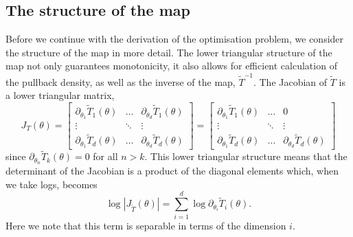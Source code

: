 \documentclass[final]{siamltex}
\begin{document}
\subsection{The structure of the map}

Before we continue with the derivation of the optimisation problem, we consider the structure
of the map in more detail. The lower triangular structure of the map not only guarantees monotonicity, it also allows for efficient calculation of the pullback density, as well as the inverse of the map, $\tilde{T}^{-1}$. The Jacobian of $\tilde{T}$ is a lower triangular matrix,
\[
	J_T(\theta) = \begin{bmatrix}
		\partial_{\theta_1} \tilde{T}_1(\theta) & \dots & \partial_{\theta_d} \tilde{T}_1(\theta)\\
		\vdots & \ddots & \vdots \\
		\partial_{\theta_1} \tilde{T}_d(\theta) & \dots & \partial_{\theta_d} \tilde{T}_d(\theta)
	\end{bmatrix} = \begin{bmatrix}
		\partial_{\theta_1} \tilde{T}_1(\theta) & \dots & 0\\
		\vdots & \ddots & \vdots \\
		\partial_{\theta_1} \tilde{T}_d(\theta) & \dots & \partial_{\theta_d} \tilde{T}_d(\theta)
	\end{bmatrix}
\]
since $\partial_{\theta_n} \tilde{T}_k(\theta) = 0$ for all $n > k$. This lower triangular structure means that the determinant of the Jacobian is a product of the diagonal elements which, when we take logs, becomes
\begin{equation}\label{eqn:separable_jacobian}
	\log\left|J_{\tilde{T}}(\theta)\right| = \sum\limits_{i=1}^d \! \log \partial_{\theta_i} \tilde{T}_i(\theta).
\end{equation}
Here we note that this term is separable in terms of the dimension $i$.

\end{document}
